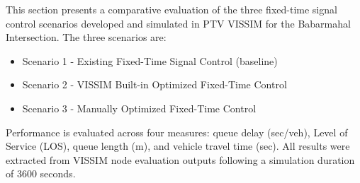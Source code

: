 This section presents a comparative evaluation of the three fixed-time signal control scenarios developed and simulated in PTV VISSIM for the Babarmahal Intersection. The three scenarios are:
\begin{itemize}
    \item Scenario 1 - Existing Fixed-Time Signal Control (baseline)
    \item Scenario 2 - VISSIM Built-in Optimized Fixed-Time Control
    \item Scenario 3 - Manually Optimized Fixed-Time Control
\end{itemize}

Performance is evaluated across four measures: queue delay 
(sec/veh), Level of Service (LOS), queue length (m), and 
vehicle travel time (sec). All results were extracted from 
VISSIM node evaluation outputs following a simulation 
duration of 3600 seconds.






